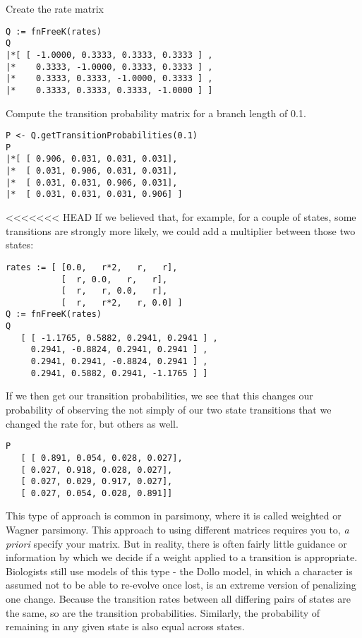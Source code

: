 Create the rate matrix
{\tt \begin{snugshade*}
\begin{lstlisting}
Q := fnFreeK(rates)
Q
|*[ [ -1.0000, 0.3333, 0.3333, 0.3333 ] ,
|*    0.3333, -1.0000, 0.3333, 0.3333 ] ,
|*    0.3333, 0.3333, -1.0000, 0.3333 ] ,
|*    0.3333, 0.3333, 0.3333, -1.0000 ] ]
\end{lstlisting}
\end{snugshade*}}

Compute the transition probability matrix for a branch length of 0.1.

{\tt \begin{snugshade*}
\begin{lstlisting}
P <- Q.getTransitionProbabilities(0.1)
P
|*[ [ 0.906, 0.031, 0.031, 0.031],
|*  [ 0.031, 0.906, 0.031, 0.031],
|*  [ 0.031, 0.031, 0.906, 0.031],
|*  [ 0.031, 0.031, 0.031, 0.906] ]
\end{lstlisting}
\end{snugshade*}}

<<<<<<< HEAD
If we believed that, for example, for a couple of states, some transitions are strongly more likely, we could add a multiplier between those two states:

{\tt \begin{snugshade*}
\begin{lstlisting}
rates := [ [0.0,   r*2,   r,   r],
           [  r, 0.0,   r,   r],
           [  r,   r, 0.0,   r],
           [  r,   r*2,   r, 0.0] ]
Q := fnFreeK(rates)
Q
   [ [ -1.1765, 0.5882, 0.2941, 0.2941 ] ,
     0.2941, -0.8824, 0.2941, 0.2941 ] ,
     0.2941, 0.2941, -0.8824, 0.2941 ] ,
     0.2941, 0.5882, 0.2941, -1.1765 ] ]
\end{lstlisting}
\end{snugshade*}}

If we then get our transition probabilities, we see that this changes our probability of observing the not simply of our two state transitions that we changed the rate for, but others as well.

{\tt \begin{snugshade*}
\begin{lstlisting}
P
   [ [ 0.891, 0.054, 0.028, 0.027], 
   [ 0.027, 0.918, 0.028, 0.027], 
   [ 0.027, 0.029, 0.917, 0.027], 
   [ 0.027, 0.054, 0.028, 0.891]]
\end{lstlisting}
\end{snugshade*}}

This type of approach is common in parsimony, where it is called weighted or Wagner parsimony. 
This approach to using different matrices requires you to, \textit{a priori} specify your matrix.
But in reality, there is often fairly little guidance or information by which we decide if a weight applied to a transition is appropriate.
Biologists still use models of this type - the Dollo model, in which a character is assumed not to be able to re-evolve once lost, is an extreme version of penalizing one change.
Because the transition rates between all differing pairs of states are the same, so are the transition probabilities.
Similarly, the probability of remaining in any given state is also equal across states.

